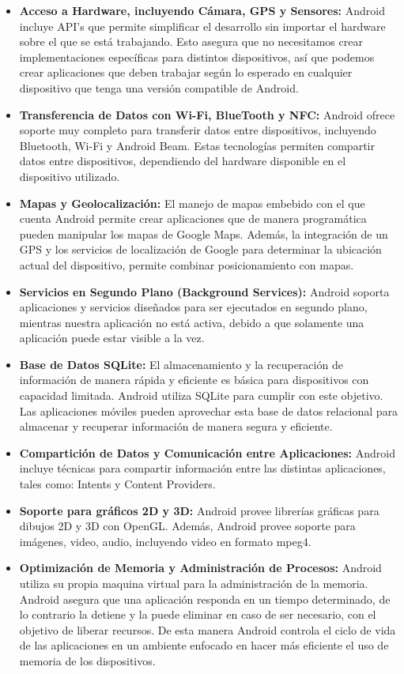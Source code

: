 \begin{itemize}
	\item \textbf{Acceso a Hardware, incluyendo Cámara, GPS y Sensores: }Android incluye API’s que permite simplificar el desarrollo sin importar el hardware sobre el que se está trabajando. Esto asegura que no necesitamos crear implementaciones específicas para distintos dispositivos, así que podemos crear aplicaciones que deben trabajar según lo esperado en cualquier dispositivo que tenga una versión compatible de Android.
	\item \textbf{Transferencia de Datos con Wi-Fi, BlueTooth y NFC: } Android ofrece soporte muy completo para transferir datos entre dispositivos, incluyendo Bluetooth, Wi-Fi y Android Beam. Estas tecnologías permiten compartir datos entre dispositivos, dependiendo del hardware disponible en el dispositivo utilizado.
	\item \textbf{Mapas y Geolocalización: }El manejo de mapas embebido con el que cuenta Android permite crear aplicaciones que de manera programática pueden manipular los mapas de Google Maps. Además, la integración de un GPS y los servicios de localización de Google para determinar la ubicación actual del dispositivo, permite combinar posicionamiento con mapas.
	\item \textbf{Servicios en Segundo Plano (Background Services): }Android soporta aplicaciones y servicios diseñados para ser ejecutados en segundo plano, mientras nuestra aplicación no está activa, debido a que solamente una aplicación puede estar visible a la vez. 
	\item \textbf{Base de Datos SQLite: }El almacenamiento y la recuperación de información de manera rápida y eficiente es básica para dispositivos con capacidad limitada. Android utiliza SQLite para cumplir con este objetivo. Las aplicaciones móviles pueden aprovechar esta base de datos relacional para almacenar y recuperar información de manera segura y eficiente.
	\item \textbf{Compartición de Datos y Comunicación entre Aplicaciones: }Android incluye técnicas para compartir información entre las distintas aplicaciones, tales como: Intents y Content Providers.
	\item \textbf{ Soporte para gráficos 2D y 3D: }Android provee librerías gráficas para dibujos 2D y 3D con OpenGL. Además, Android provee soporte para imágenes, video, audio, incluyendo video en formato mpeg4.
	\item \textbf{Optimización de Memoria y Administración de Procesos: }Android utiliza su propia maquina virtual para la administración de la memoria. Android asegura que una aplicación responda en un tiempo determinado, de lo contrario la detiene y la puede eliminar en caso de ser necesario, con el objetivo de liberar recursos. De esta manera Android controla el ciclo de vida de las aplicaciones en un ambiente enfocado en hacer más eficiente el uso de memoria de los dispositivos. \cite{presentacionAndroid}
\end{itemize}

